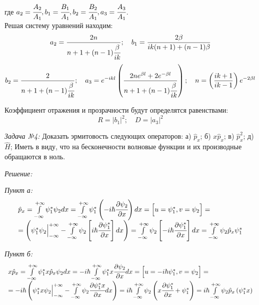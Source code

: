 где 
\( 
	a_2 = \cfrac{A_2}{A_1}, b_1 = \cfrac{B_1}{A_1}, b_2 = \cfrac{B_2}{A_1}, 
	a_3 = \cfrac{A_3}{A_1}
\). \\

Решая систему уравнений находим:
\[
	a_2 = \frac{2n}{n+1+(n-1)\cfrac{\beta}{ik}};\quad
	b_1 = \frac{2\beta}{ik(n+1)+(n-1)\beta}
\]
\[
	b_2 = \frac{2}{n+1+(n-1)\cfrac{\beta}{ik}};\quad
	a_3 = e^{-ikl}\left( \frac{2ne^{\beta l} + 2e^{-\beta l}}
		{n+1+(n-1)\cfrac{\beta}{ik}}\right);\quad
	n = \left( \frac{ik+1}{ik-1}\right)e^{-2\beta l}
\]

Коэффициент отражения и прозрачности будут определятся равенствами:
\[
	R = \vert b_1 \vert ^2;\quad
	D = \vert a_3 \vert ^2
\]

\pagebreak

\emph{Задача №4:} Доказать эрмитовость следующих операторов: 
а) \( \hat{p}_x \);
б) \( x\hat{p}_x \);
в) \( \hat{p}^2_x \);
д) \( \hat{H} \);
Иметь в виду, что на бесконечности волновые функции и их производные обращаются 
в ноль.

\emph{Решение:}

\emph{Пункт а:}
\[
\begin{array}{ll}
	\hat{p}_x = \int\limits_{-\infty}^{+\infty} \psi_{1}^{*} \psi_2 dx =
		\int\limits_{-\infty}^{+\infty} \psi_{1}^{*} 
		\left( -i\hbar\cfrac{\partial\psi_2}{\partial x} \right) dx = 
		\Big[ u = \psi_{1}^{*}, v = \psi_{2} \Big] = \\ =
		\left( \psi_{1}^{*}\psi_{2} \Big\vert_{-\infty}^{+\infty} -
		\int\limits_{-\infty}^{+\infty} \psi_{2} 
		\left[ i\hbar \cfrac{\partial\psi_{1}^{*}}{\partial x} \right] dx \right) =
		\int\limits_{-\infty}^{+\infty} \psi_{2} 
		\left[ -i\hbar \cfrac{\partial\psi_{1}^{*}}{\partial x} \right] dx =
		\int\limits_{-\infty}^{+\infty} \psi_{2} \hat{p}_x \psi_{1}^{*}
\end{array}
\]

\emph{Пункт б:}
\[
\begin{array}{ll}
	x\hat{p}_{x} = \int\limits_{-\infty}^{+\infty} \psi_{1}^{*} x\hat{p}_{x}
		\psi_{2} dx = -i\hbar \int\limits_{-\infty}^{+\infty} \psi_{1}^{*}
		x\cfrac{\partial\psi_2}{\partial x} dx =
		\Big[ u = -i\hbar\psi_{1}^{*}, v = \psi_{2} \Big] = \\ =
		-i\hbar\left( \psi_{1}^{*} x \psi_{2} 
		\Big\vert_{-\infty}^{+\infty} - 
		\int\limits_{-\infty}^{+\infty} \psi_{2} 
		\cfrac{\partial \psi_{1}^{*} x}{\partial x} dx \right) =
		i\hbar\int\limits_{-\infty}^{+\infty} \psi_{2} 
		\left( x\cfrac{\partial\psi_{1}^{*}}{\partial x} + \psi_{1}^{*} \right) =
		i\hbar\int\limits_{-\infty}^{+\infty} \psi_{2} 
		\hat{p}_x \left( \psi_{1}^{*} x \right)
\end{array}
\]

